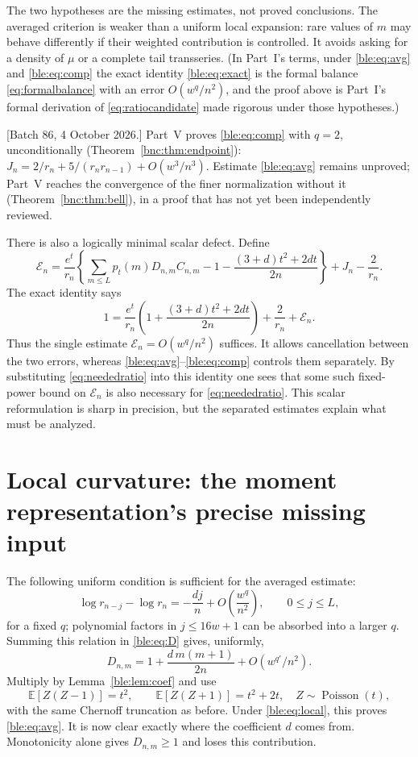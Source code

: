 \documentclass[11pt]{article}
\numberwithin{equation}{section}
\theoremstyle{definition}
\theoremstyle{remark}
\newcommand{\E}{\mathbb E}
\begin{document}
The two hypotheses are the missing estimates, not proved conclusions. The
averaged criterion is weaker than a uniform local expansion: rare values
of $m$ may behave differently if their weighted contribution is
controlled. It avoids asking for a density of $\mu$ or a complete tail
transseries. (In Part~I's terms, under \eqref{ble:eq:avg} and
\eqref{ble:eq:comp} the exact identity \eqref{ble:eq:exact} is the formal
balance \eqref{eq:formalbalance} with an error $O(w^q/n^2)$, and the proof
above is Part~I's formal derivation of \eqref{eq:ratiocandidate} made
rigorous under those hypotheses.)

[Batch 86, 4 October 2026.] Part~V proves \eqref{ble:eq:comp} with $q=2$,
unconditionally (Theorem~\ref{bnc:thm:endpoint}):
$J_n=2/r_n+5/(r_nr_{n-1})+O(w^3/n^3)$. Estimate \eqref{ble:eq:avg} remains
unproved; Part~V reaches the convergence of the finer normalization
without it (Theorem~\ref{bnc:thm:bell}), in a proof that has not yet been
independently reviewed.

There is also a logically minimal scalar defect. Define
\begin{equation}\label{ble:eq:defect}
 \mathcal E_n=
 \frac{e^t}{r_n}\left\{\sum_{m\le L}p_t(m)D_{n,m}C_{n,m}
 -1-\frac{(3+d)t^2+2dt}{2n}\right\}
 +J_n-\frac2{r_n}.
\end{equation}
The exact identity says
\[
 1=\frac{e^t}{r_n}\left(1+\frac{(3+d)t^2+2dt}{2n}\right)
       +\frac2{r_n}+\mathcal E_n.
\]
Thus the single estimate $\mathcal E_n=O(w^q/n^2)$ suffices. It allows
cancellation between the two errors, whereas
\eqref{ble:eq:avg}--\eqref{ble:eq:comp} controls them separately. By
substituting \eqref{eq:neededratio} into this identity one sees that some
such fixed-power bound on $\mathcal E_n$ is also necessary for
\eqref{eq:neededratio}. This scalar reformulation is sharp in precision,
but the separated estimates explain what must be analyzed.

\section{Local curvature: the moment representation's precise missing input}\label{ble:sec:curvature}
The following uniform condition is sufficient for the averaged estimate:
\begin{equation}\label{ble:eq:local}
 \log r_{n-j}-\log r_n=-\frac{dj}{n}
                +O\!\left(\frac{w^q}{n^2}\right),
 \qquad 0\le j\le L,
\end{equation}
for a fixed $q$; polynomial factors in $j\le16w+1$ can be absorbed into a
larger $q$.
Summing this relation in \eqref{ble:eq:D} gives, uniformly,
\begin{equation}\label{ble:eq:localD}
 D_{n,m}=1+\frac{d\,m(m+1)}{2n}+O(w^{q'}/n^2).
\end{equation}
Multiply by Lemma~\ref{ble:lem:coef} and use
\[
 \E[Z(Z-1)]=t^2,\qquad \E[Z(Z+1)]=t^2+2t,
 \quad Z\sim\operatorname{Poisson}(t),
\]
with the same Chernoff truncation as before. Under \eqref{ble:eq:local},
this proves \eqref{ble:eq:avg}. It is now clear exactly where the
coefficient $d$ comes from. Monotonicity alone gives $D_{n,m}\ge1$ and
loses this contribution.
\end{document}
